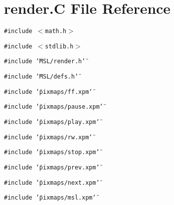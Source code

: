 \section{render.C File Reference}
\label{render_8C}
{\tt \#include $<$math.h$>$}\par
{\tt \#include $<$stdlib.h$>$}\par
{\tt \#include \char`\"{}MSL/render.h\char`\"{}}\par
{\tt \#include \char`\"{}MSL/defs.h\char`\"{}}\par
{\tt \#include \char`\"{}pixmaps/ff.xpm\char`\"{}}\par
{\tt \#include \char`\"{}pixmaps/pause.xpm\char`\"{}}\par
{\tt \#include \char`\"{}pixmaps/play.xpm\char`\"{}}\par
{\tt \#include \char`\"{}pixmaps/rw.xpm\char`\"{}}\par
{\tt \#include \char`\"{}pixmaps/stop.xpm\char`\"{}}\par
{\tt \#include \char`\"{}pixmaps/prev.xpm\char`\"{}}\par
{\tt \#include \char`\"{}pixmaps/next.xpm\char`\"{}}\par
{\tt \#include \char`\"{}pixmaps/msl.xpm\char`\"{}}\par
